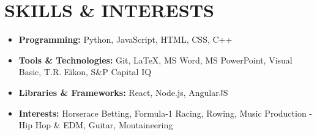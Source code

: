 \documentclass{article}
\begin{document}

\section{SKILLS \& INTERESTS}
\vspace{-2mm}
\begin{itemize}[noitemsep]
\item \textbf{Programming:} Python, JavaScript, HTML, CSS, C++
\item \textbf{Tools \& Technologies:} Git, {\LaTeX}, MS Word, MS PowerPoint, Visual Basic, T.R. Eikon, S\&P Capital IQ
\item \textbf{Libraries \& Frameworks:} React, Node.js, AngularJS
\item \textbf{Interests:} Horserace Betting, Formula-1 Racing, Rowing, Music Production - Hip Hop \& EDM, Guitar, Moutaineering
\end{itemize}
\end{document}
